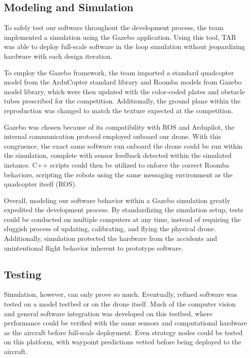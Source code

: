 \documentclass[12pt,letterpaper]{article}
\begin{document}
	\subsection*{Modeling and Simulation}

		To safely test our software throughout the development process, the team implemented a simulation using the Gazebo application. Using this tool, TAR was able to deploy full-scale software in the loop simulation without jeopardizing hardware with each design iteration.

		To employ the Gazebo framework, the team imported a standard quadcopter model from the ArduCopter standard library and Roomba models from Gazebo model library, which were then updated with the color-coded plates and obstacle tubes prescribed for the competition. Additionally, the ground plane within the reproduction was changed to match the texture expected at the competition.

		Gazebo was chosen because of its compatibility with ROS and Ardupilot, the internal communication protocol employed onboard our drone. With this congruence, the exact same software run onboard the drone could be run within the simulation, complete with sensor feedback detected within the simulated instance. C++ scripts could then be utilized to enforce the correct Roomba behaviors, scripting the robots using the same messaging environment as the quadcopter itself (ROS).

		Overall, modeling our software behavior within a Gazebo simulation greatly expedited the development process. By standardizing the simulation setup, tests could be conducted on multiple computers at any time, instead of requiring the sluggish process of updating, calibrating, and flying the physical drone. Additionally, simulation protected the hardware from the accidents and unintentional flight behavior inherent to prototype software.


	\subsection*{Testing}
		Simulation, however, can only prove so much. Eventually, refined software was tested on a model testbed or on the drone itself. Much of the computer vision and general software integration was developed on this testbed, where performance could be verified with the same sensors and computational hardware as the aircraft before full-scale deployment. Even strategy nodes could be tested on this platform, with waypoint predictions vetted before being deployed to the aircraft.
\end{document}
